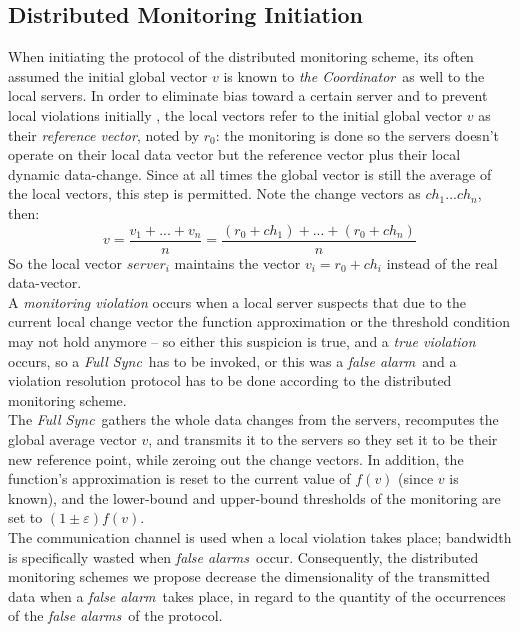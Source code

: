 \documentclass[10pt, conference]{IEEEtran}
\newcommand{\fullSync}{\textit{Full Sync}}
\newcommand{\falseAlarm}{\textit{false alarm}}
\newcommand{\falseAlarms}{\textit{false alarms}}
\newcommand{\theCoordinator}{\textit{the Coordinator}}
\begin{document}
\subsection{Distributed Monitoring Initiation}
When initiating the protocol of the distributed monitoring scheme, its often assumed the initial global vector $v$ is known to \theCoordinator \ as well to the local servers. In order to eliminate bias toward a certain server and to prevent local violations initially \cite{sharfman2007geometric},  the local vectors refer to the initial global vector $v$ as their \textit{reference vector}, noted by $r_0$: the monitoring is done so the servers doesn't operate on their local data vector but the reference vector plus their local dynamic data-change. Since at all times the global vector is still the average of the local vectors, this step is permitted. Note the change vectors as ${ch_1 ... ch_n}$, then: \\
\begin{equation}
v = \frac{v_1+...+ v_n}{n} = \frac{(r_0+ch_1)+...+(r_0+ch_n)}{n}
\end{equation}
So the local vector $server_i$ maintains the vector $v_i = r_0 + ch_i$ instead of the real data-vector. \\
A \textit{monitoring violation} occurs when a local server suspects that due to the current local change vector the function approximation or the threshold condition may not hold anymore -- so either this suspicion is true, and a \textit{true violation} occurs, so a \fullSync \ has to be invoked, or this was a \falseAlarm \ and a violation resolution protocol has to be done according to the distributed monitoring scheme. \\
The \fullSync \ gathers the whole data changes from the servers, recomputes the global average vector $v$, and transmits it to the servers so they set it to be their new reference point, while zeroing out the change vectors. In addition, the function's approximation is reset to the current value of $f(v)$ (since $v$ is known), and the lower-bound and upper-bound thresholds of the monitoring are set to ${(1 \pm \varepsilon )f(v)}$. \\
The communication channel is used when a local violation takes place; bandwidth is specifically wasted when \falseAlarms \ occur. Consequently, the distributed monitoring schemes we propose decrease the dimensionality of the transmitted data when a \falseAlarm \ takes place, in regard to the quantity of the occurrences of the \falseAlarms \ of the protocol.
\end{document}
